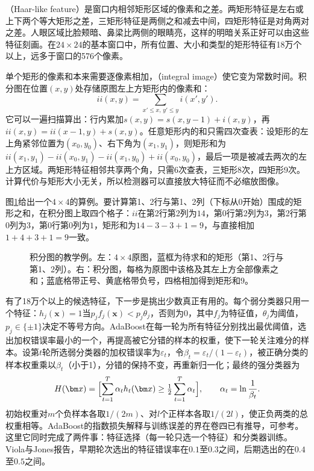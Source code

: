 （Haar-like feature）是窗口内相邻矩形区域的像素和之差。两矩形特征是左右或上下两个等大矩形之差，三矩形特征是两侧之和减去中间，四矩形特征是对角两对之差。人眼区域比脸颊暗、鼻梁比两侧的眼睛亮，这样的明暗关系正好可以由这些特征刻画。在$24\times24$的基本窗口中，所有位置、大小和类型的矩形特征有18万个以上，远多于窗口的576个像素。

单个矩形的像素和本来需要逐像素相加，（integral image）使它变为常数时间。积分图在位置$(x,y)$处存储原图左上方矩形内的像素和：
\begin{equation}
  ii(x,y)=\sum_{x'\leq x,\,y'\leq y}i(x',y').
  \label{eq:vision-features-integral-image}
\end{equation}
它可以一遍扫描算出：行内累加$s(x,y)=s(x,y-1)+i(x,y)$，再$ii(x,y)=ii(x-1,y)+s(x,y)$。任意矩形内的和只需四次查表：设矩形的左上角紧邻位置为$(x_0,y_0)$、右下角为$(x_1,y_1)$，则矩形和为$ii(x_1,y_1)-ii(x_0,y_1)-ii(x_1,y_0)+ii(x_0,y_0)$，最后一项是被减去两次的左上方区域。两矩形特征相邻共享两个角，只需6次查表，三矩形8次，四矩形9次。计算代价与矩形大小无关，所以检测器可以直接放大特征而不必缩放图像。

图\ref{fig:vision-features-integral-image}给出一个$4\times4$的算例。要计算第1、2行与第1、2列（下标从0开始）围成的矩形之和，在积分图上取四个格子：$ii$在第2行第2列为$14$，第0行第2列为$3$，第2行第0列为$3$，第0行第0列为$1$，矩形和为$14-3-3+1=9$，与直接相加$1+4+3+1=9$一致。

\begin{figure}[htbp]
  \centering
  
  \caption{积分图的教学例。左：$4\times4$原图，蓝框为待求和的矩形（第1、2行与第1、2列）。右：积分图，每格为原图中该格及其左上方全部像素之和；蓝底格带正号、黄底格带负号，四格相加得到矩形和$9$。}
  \label{fig:vision-features-integral-image}
\end{figure}

有了18万个以上的候选特征，下一步是挑出少数真正有用的。每个弱分类器只用一个特征：$h_j(\bm x)=1$当$p_jf_j(\bm x)<p_j\theta_j$，否则为$0$，其中$f_j$为特征值，$\theta_j$为阈值，$p_j\in\{\pm1\}$决定不等号方向。AdaBoost在每一轮为所有特征分别找出最优阈值，选出加权错误率最小的一个，再提高被它分错的样本的权重，使下一轮关注难分的样本。设第$t$轮所选弱分类器的加权错误率为$\varepsilon_t$，令$\beta_t=\varepsilon_t/(1-\varepsilon_t)$，被正确分类的样本权重乘以$\beta_t$（小于1），分错的保持不变，再重新归一化；最终的强分类器为
\begin{equation}
  H(\bm x)=\Bigl[\sum_{t=1}^{T}\alpha_th_t(\bm x)\geq\tfrac12\sum_{t=1}^{T}\alpha_t\Bigr],\qquad \alpha_t=\ln\frac1{\beta_t}.
  \label{eq:vision-features-adaboost}
\end{equation}
初始权重对$m$个负样本各取$1/(2m)$、对$l$个正样本各取$1/(2l)$，使正负两类的总权重相等。AdaBoost的指数损失解释与训练误差的界在卷四已有推导，可参考。这里它同时完成了两件事：特征选择（每一轮只选一个特征）和分类器训练。Viola与Jones报告，早期轮次选出的特征错误率在$0.1$至$0.3$之间，后期选出的在$0.4$至$0.5$之间。

